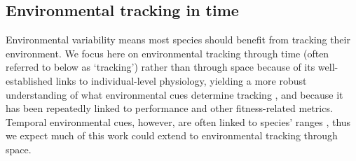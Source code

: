 \documentclass[11pt,letterpaper]{article}
\begin{document}
\subsection{Environmental tracking in time}

Environmental variability means most species should benefit from tracking their environment. We focus here on environmental tracking through time (often referred to below as `tracking') rather than through space because of its well-established links to individual-level physiology, yielding a more robust understanding of what environmental cues determine tracking \citep{chuineJTB,Chew:2012pd}, and because it has been repeatedly linked to performance and other fitness-related metrics. Temporal environmental cues, however, are often linked to species' ranges \citep{Morin:2008vp,arabid2011}, thus we expect much of this work could extend to environmental tracking through space.  %
\end{document}

